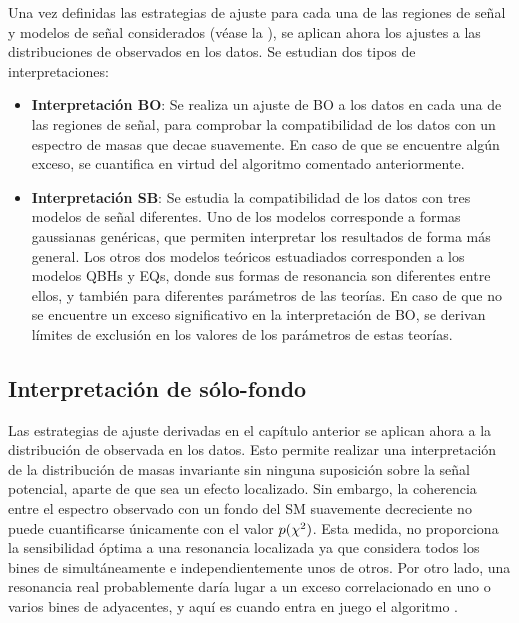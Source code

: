 Una vez definidas las estrategias de ajuste para cada una de las regiones de señal y modelos de señal considerados (véase la \Tab{\ref{tab:bkg:modeling:strategy_modeling:summary}}), se aplican ahora los ajustes a las distribuciones de \myj observados en los datos. Se estudian dos tipos de interpretaciones:
\begin{itemize}
    \item \textbf{Interpretación \acf{BO}}: Se realiza un ajuste de \ac{BO} a los datos en cada una de las regiones de señal, para comprobar la compatibilidad de los datos con un espectro de masas que decae suavemente. En caso de que se encuentre algún exceso, se cuantifica en virtud del algoritmo \bh comentado anteriormente.
    \item \textbf{Interpretación \acf{SB}}: Se estudia la compatibilidad de los datos con tres modelos de señal diferentes. Uno de los modelos corresponde a formas gaussianas genéricas, que permiten interpretar los resultados de forma más general. Los otros dos modelos teóricos estuadiados corresponden a los modelos \acp{QBH} y \acp{EQ}, donde sus formas de resonancia son diferentes entre ellos, y también para diferentes parámetros de las teorías. En caso de que no se encuentre un exceso significativo en la interpretación de \ac{BO}, se derivan límites de exclusión en los valores de los parámetros de estas teorías.
\end{itemize}







\subsection{Interpretación de sólo-fondo}
\label{subsec:results:results:bkgonly}

Las estrategias de ajuste derivadas en el capítulo anterior se aplican ahora a la distribución de \myj observada en los datos. Esto permite realizar una interpretación de la distribución de masas invariante sin ninguna suposición sobre la señal potencial, aparte de que sea un efecto localizado. Sin embargo, la coherencia entre el espectro \myj observado con un fondo del \ac{SM} suavemente decreciente no puede cuantificarse únicamente con el valor \(p(\chi^{2})\). Esta medida, no proporciona la sensibilidad óptima a una resonancia localizada ya que considera todos los bines de \myj simultáneamente e independientemente unos de otros. Por otro lado, una resonancia real probablemente daría lugar a un exceso correlacionado en uno o varios bines de \myj adyacentes, y aquí es cuando entra en juego el algoritmo \bh.

